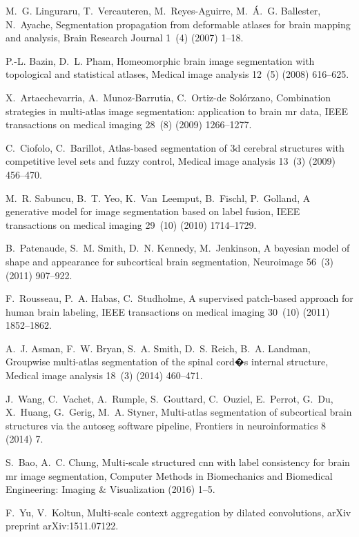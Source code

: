 \documentclass[twoside,fleqn,espcrc2]{elsarticle}
\begin{document}
\begin{thebibliography}{10}
M.~G. Linguraru, T.~Vercauteren, M.~Reyes-Aguirre, M.~{\'A}.~G. Ballester,
  N.~Ayache, Segmentation propagation from deformable atlases for brain mapping
  and analysis, Brain Research Journal 1~(4) (2007) 1--18.

P.-L. Bazin, D.~L. Pham, Homeomorphic brain image segmentation with topological
  and statistical atlases, Medical image analysis 12~(5) (2008) 616--625.

X.~Artaechevarria, A.~Munoz-Barrutia, C.~Ortiz-de Sol{\'o}rzano, Combination
  strategies in multi-atlas image segmentation: application to brain mr data,
  IEEE transactions on medical imaging 28~(8) (2009) 1266--1277.

C.~Ciofolo, C.~Barillot, Atlas-based segmentation of 3d cerebral structures
  with competitive level sets and fuzzy control, Medical image analysis 13~(3)
  (2009) 456--470.

M.~R. Sabuncu, B.~T. Yeo, K.~Van~Leemput, B.~Fischl, P.~Golland, A generative
  model for image segmentation based on label fusion, IEEE transactions on
  medical imaging 29~(10) (2010) 1714--1729.

B.~Patenaude, S.~M. Smith, D.~N. Kennedy, M.~Jenkinson, A bayesian model of
  shape and appearance for subcortical brain segmentation, Neuroimage 56~(3)
  (2011) 907--922.

F.~Rousseau, P.~A. Habas, C.~Studholme, A supervised patch-based approach for
  human brain labeling, IEEE transactions on medical imaging 30~(10) (2011)
  1852--1862.

A.~J. Asman, F.~W. Bryan, S.~A. Smith, D.~S. Reich, B.~A. Landman, Groupwise
  multi-atlas segmentation of the spinal cord�s internal structure, Medical
  image analysis 18~(3) (2014) 460--471.

J.~Wang, C.~Vachet, A.~Rumple, S.~Gouttard, C.~Ouziel, E.~Perrot, G.~Du,
  X.~Huang, G.~Gerig, M.~A. Styner, Multi-atlas segmentation of subcortical
  brain structures via the autoseg software pipeline, Frontiers in
  neuroinformatics 8 (2014) 7.

S.~Bao, A.~C. Chung, Multi-scale structured cnn with label consistency for
  brain mr image segmentation, Computer Methods in Biomechanics and Biomedical
  Engineering: Imaging \& Visualization (2016) 1--5.

F.~Yu, V.~Koltun, Multi-scale context aggregation by dilated convolutions,
  arXiv preprint arXiv:1511.07122.

\end{thebibliography}
\end{document}
